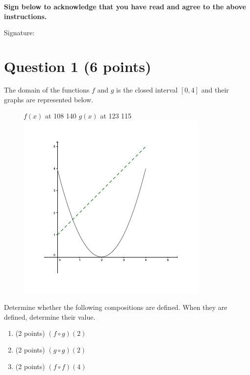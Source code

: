 \documentclass{article}
\begin{document}
\vspace{1in}

\textbf{Sign below to acknowledge that you have read and agree to the above instructions.}

\vspace{0.5cm}

\noindent Signature: \underline{\hspace{5in}}

\pagestyle{empty}

\newpage

\pagestyle{plain}

\section*{Question 1 (6 points)}
The domain of the functions $f$ and $g$ is the closed interval $[0,4]$ and their graphs are represented below.
\begin{figure}[h!]
	\small
	\pinlabel $f(x)$ at 108 140
	\pinlabel $g(x)$ at 123 115
	\endlabellist
	\includegraphics[width=0.6
\textwidth]{1-3-01}
\end{figure}

Determine whether the following compositions are defined. When they are defined, determine their value.

 \begin{enumerate}[label=(\alph*)]
    \item (2 points) $(f\circ g)(2)$
    \vspace{1in}
    \item (2 points) $(g\circ g)(2)$
    \vspace{1in}
    \item (2 points) $(f\circ f)(4)$
    \end{enumerate}
\end{document}
